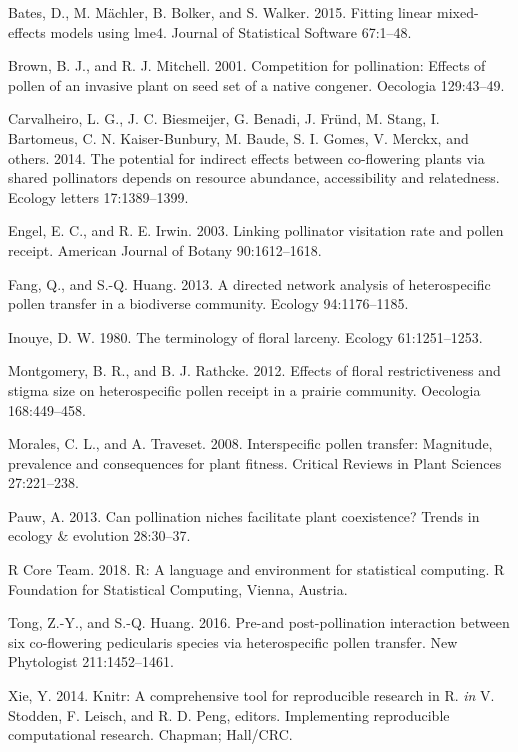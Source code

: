 \documentclass[11pt,a4paper]{article}
\begin{document}
\hypertarget{ref-Bates_2015}{}
Bates, D., M. Mächler, B. Bolker, and S. Walker. 2015. Fitting linear
mixed-effects models using lme4. Journal of Statistical Software
67:1--48.

\hypertarget{ref-brown2001}{}
Brown, B. J., and R. J. Mitchell. 2001. Competition for pollination:
Effects of pollen of an invasive plant on seed set of a native congener.
Oecologia 129:43--49.

\hypertarget{ref-carvalheiro2014}{}
Carvalheiro, L. G., J. C. Biesmeijer, G. Benadi, J. Fründ, M. Stang, I.
Bartomeus, C. N. Kaiser-Bunbury, M. Baude, S. I. Gomes, V. Merckx, and
others. 2014. The potential for indirect effects between co-flowering
plants via shared pollinators depends on resource abundance,
accessibility and relatedness. Ecology letters 17:1389--1399.

\hypertarget{ref-engel2003}{}
Engel, E. C., and R. E. Irwin. 2003. Linking pollinator visitation rate
and pollen receipt. American Journal of Botany 90:1612--1618.

\hypertarget{ref-fang2013}{}
Fang, Q., and S.-Q. Huang. 2013. A directed network analysis of
heterospecific pollen transfer in a biodiverse community. Ecology
94:1176--1185.

\hypertarget{ref-inouye1980}{}
Inouye, D. W. 1980. The terminology of floral larceny. Ecology
61:1251--1253.

\hypertarget{ref-montgomery2012}{}
Montgomery, B. R., and B. J. Rathcke. 2012. Effects of floral
restrictiveness and stigma size on heterospecific pollen receipt in a
prairie community. Oecologia 168:449--458.

\hypertarget{ref-morales2008}{}
Morales, C. L., and A. Traveset. 2008. Interspecific pollen transfer:
Magnitude, prevalence and consequences for plant fitness. Critical
Reviews in Plant Sciences 27:221--238.

\hypertarget{ref-pauw2013}{}
Pauw, A. 2013. Can pollination niches facilitate plant coexistence?
Trends in ecology \& evolution 28:30--37.

\hypertarget{ref-R_Core_Team_2018}{}
R Core Team. 2018. R: A language and environment for statistical
computing. R Foundation for Statistical Computing, Vienna, Austria.

\hypertarget{ref-tong2016}{}
Tong, Z.-Y., and S.-Q. Huang. 2016. Pre-and post-pollination interaction
between six co-flowering pedicularis species via heterospecific pollen
transfer. New Phytologist 211:1452--1461.

\hypertarget{ref-Xie_2014}{}
Xie, Y. 2014. Knitr: A comprehensive tool for reproducible research in
R. \emph{in} V. Stodden, F. Leisch, and R. D. Peng, editors.
Implementing reproducible computational research. Chapman; Hall/CRC.
\end{document}
